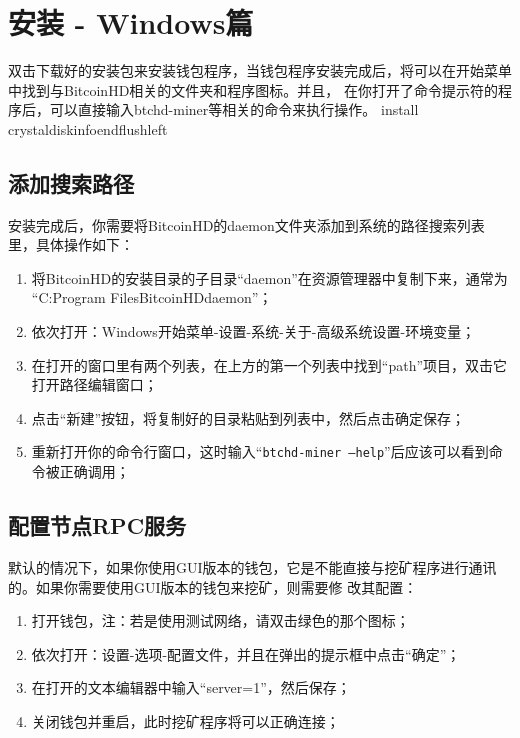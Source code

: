 \section{安装 - Windows篇}
\begin{flushleft}
    双击下载好的安装包来安装钱包程序，当钱包程序安装完成后，将可以在开始菜单中找到与BitcoinHD相关的文件夹和程序图标。并且，
    在你打开了命令提示符的程序后，可以直接输入btchd-miner等相关的命令来执行操作。
\choco install crystaldiskinfoend{flushleft}
\subsection{添加搜索路径}
\begin{flushleft}
    安装完成后，你需要将BitcoinHD的daemon文件夹添加到系统的路径搜索列表里，具体操作如下：
\end{flushleft}
\begin{enumerate}
    \item 将BitcoinHD的安装目录的子目录``daemon''在资源管理器中复制下来，通常为
        ``C:Program FilesBitcoinHDdaemon''；
    \item 依次打开：Windows开始菜单-设置-系统-关于-高级系统设置-环境变量；
    \item 在打开的窗口里有两个列表，在上方的第一个列表中找到``path''项目，双击它打开路径编辑窗口；
    \item 点击``新建''按钮，将复制好的目录粘贴到列表中，然后点击确定保存；
    \item 重新打开你的命令行窗口，这时输入``\texttt{btchd-miner --help}''后应该可以看到命令被正确调用；
\end{enumerate}
\subsection{配置节点RPC服务}
\begin{flushleft}
    默认的情况下，如果你使用GUI版本的钱包，它是不能直接与挖矿程序进行通讯的。如果你需要使用GUI版本的钱包来挖矿，则需要修
    改其配置：
\end{flushleft}
\begin{enumerate}
    \item 打开钱包，注：若是使用测试网络，请双击绿色的那个图标；
    \item 依次打开：设置-选项-配置文件，并且在弹出的提示框中点击``确定''；
    \item 在打开的文本编辑器中输入``server=1''，然后保存；
    \item 关闭钱包并重启，此时挖矿程序将可以正确连接；
\end{enumerate}

\end{flushleft}
